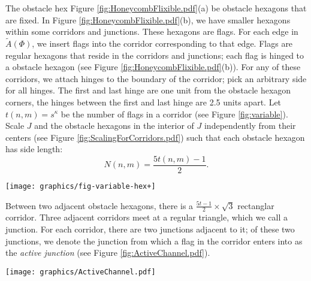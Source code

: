 \documentclass[10pt]{CSUNthesis}
\theoremstyle{plain}%
\theoremstyle{definition}
\theoremstyle{remark}
\begin{document}
The obstacle hex Figure \ref{fig:HoneycombFlixible.pdf}(a) be obstacle hexagons that are fixed.
In Figure \ref{fig:HoneycombFlixible.pdf}(b), we have smaller hexagons within some corridors and junctions.
These hexagons are flags.
For each edge in $\tilde{A}(\Phi)$, we insert flags into the corridor corresponding to that edge.
Flags are regular hexagons that reside in the corridors and junctions; each flag is hinged to a obstacle hexagon (see Figure \ref{fig:HoneycombFlixible.pdf}(b)).  
For any of these corridors, we attach hinges to the boundary of the corridor; pick an arbitrary side for all hinges.  
The first and last hinge are one unit from the obstacle hexagon corners, the hinges between the first and last hinge are 2.5 units apart.  
Let $t(n,m)=s^\kappa$ be the number of flags in a corridor (see Figure \ref{fig:variable}). 
Scale $J$ and the obstacle hexagons in the interior of $J$ independently from their centers (see Figure \ref{fig:ScalingForCorridors.pdf}) such that each obstacle hexagon has side length: $$N(n,m)=\frac{5t(n,m)-1}{2}.$$ 

\begin{minipage}{\linewidth}
\begin{center}
\texttt{[image: graphics/fig-variable-hex+]}
\label{fig:variable}
\end{center}
\end{minipage}

Between two adjacent obstacle hexagons, there is a $\frac{5t-1}{2}\times \sqrt{3}$ rectanglar corridor.  %
Three adjacent corridors meet at a regular triangle, which we call a junction. 
For each corridor, there are two junctions adjacent to it; of these two junctions, we denote the junction from which a flag in the corridor enters into as the \textit{active junction} (see Figure \ref{fig:ActiveChannel.pdf}).

\begin{minipage}{\linewidth}
\begin{center}
\texttt{[image: graphics/ActiveChannel.pdf]}
\label{fig:ActiveChannel.pdf}
\end{center}
\end{minipage}
\end{document}
